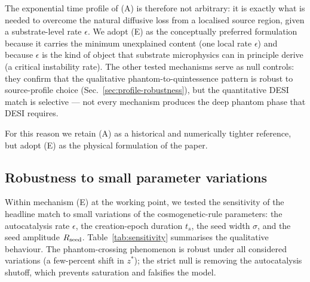 \documentclass[11pt,a4paper]{article}
\begin{document}
The exponential time profile of (A) is therefore not arbitrary: it
is exactly what is needed to overcome the natural diffusive loss
from a localised source region, given a substrate-level rate
$\epsilon$. We adopt (E) as the conceptually preferred formulation
because it carries the minimum unexplained content (one local rate
$\epsilon$) and because $\epsilon$ is the kind of object that
substrate microphysics can in principle derive (a critical
instability rate). The other tested mechanisms serve as null
controls: they confirm that the qualitative phantom-to-quintessence
pattern is robust to source-profile choice
(Sec.~\ref{sec:profile-robustness}), but the quantitative DESI
match is selective --- not every mechanism produces the deep
phantom phase that DESI requires.

For this reason we retain (A) as a historical and numerically tighter
reference, but adopt (E) as the physical formulation of the paper.

\subsection{Robustness to small parameter variations}

Within mechanism (E) at the working point, we tested the sensitivity
of the headline match to small variations of the cosmogenetic-rule
parameters: the autocatalysis rate $\epsilon$, the creation-epoch
duration $t_s$, the seed width $\sigma$, and the seed amplitude
$R_{\rm seed}$. Table~\ref{tab:sensitivity} summarises the qualitative
behaviour. The phantom-crossing phenomenon is robust under all
considered variations (a few-percent shift in $z^\ast$); the strict
null is removing the autocatalysis shutoff, which prevents saturation
and falsifies the model.
\end{document}
